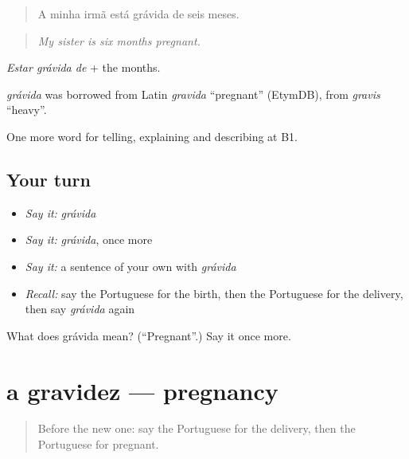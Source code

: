 \begin{quote}
A minha irmã está grávida de seis meses.
\end{quote}

\begin{quote}
\emph{My sister is six months pregnant.}
\end{quote}

\emph{Estar grávida de} + the months.

\begin{cousinweb}
\emph{grávida} was borrowed from Latin \emph{gravida} \textquotedblleft{}pregnant\textquotedblright{} (EtymDB), from \emph{gravis} \textquotedblleft{}heavy\textquotedblright{}.
\end{cousinweb}

\begin{grammarlens}[title={What you've built}]
One more word for telling, explaining and describing at B1.
\end{grammarlens}

\subsection*{Your turn}
\begin{itemize}
\raggedright
  \item \emph{Say it:} \emph{grávida}
  \item \emph{Say it:} \emph{grávida}, once more
  \item \emph{Say it:} a sentence of your own with \emph{grávida}
  \item \emph{Recall:} say the Portuguese for the birth, then the Portuguese for the delivery, then say \emph{grávida} again
\end{itemize}

\begin{tcolorbox}[breakable,colback=teal!4,colframe=teal!35!black,title={Before you move on}]
What does grávida mean? (\textquotedblleft{}Pregnant\textquotedblright{}.) Say it once more.
\end{tcolorbox}
\section[a gravidez]{a gravidez — pregnancy}

\label{lesson:PT-C309-gravidez}



\begin{quote}
Before the new one: say the Portuguese for the delivery, then the Portuguese for pregnant.
\end{quote}

